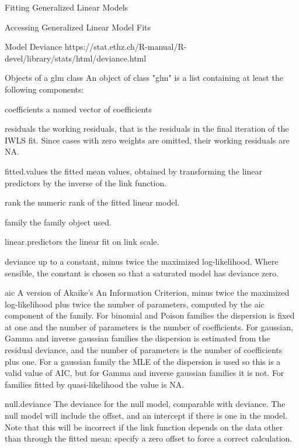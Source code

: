 Fitting Generalized Linear Models



Accessing Generalized Linear Model Fits



Model Deviance
https://stat.ethz.ch/R-manual/R-devel/library/stats/html/deviance.html


Objects of a glm class
An object of class "glm" is a list containing at least the following components: 

coefficients a named vector of coefficients
 
residuals the working residuals, that is the residuals in the final iteration of the IWLS fit. Since cases with zero weights are omitted, their working residuals are NA.
 
fitted.values the fitted mean values, obtained by transforming the linear predictors by the inverse of the link function.
 
rank the numeric rank of the fitted linear model.
 
family the family object used.
 
linear.predictors the linear fit on link scale.
 
deviance up to a constant, minus twice the maximized log-likelihood. Where sensible, the constant is chosen so that a saturated model has deviance zero.
 
aic A version of Akaike's An Information Criterion, minus twice the maximized log-likelihood plus twice the number of parameters, computed by the aic component of the family. For binomial and Poison families the dispersion is fixed at one and the number of parameters is the number of coefficients. For gaussian, Gamma and inverse gaussian families the dispersion is estimated from the residual deviance, and the number of parameters is the number of coefficients plus one. For a gaussian family the MLE of the dispersion is used so this is a valid value of AIC, but for Gamma and inverse gaussian families it is not. For families fitted by quasi-likelihood the value is NA.
 
null.deviance The deviance for the null model, comparable with deviance. The null model will include the offset, and an intercept if there is one in the model. Note that this will be incorrect if the link function depends on the data other than through the fitted mean: specify a zero offset to force a correct calculation.
 
